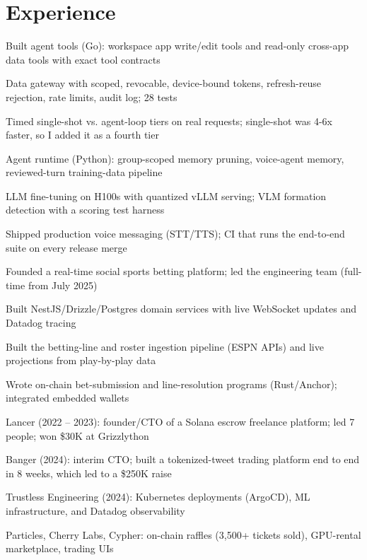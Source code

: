 \documentclass[print]{jack-resume}
\begin{document}
\section{Experience}

\begin{tightemize}
    \item Built agent tools (Go): workspace app write/edit tools and read-only cross-app data tools with exact tool contracts
    \item Data gateway with scoped, revocable, device-bound tokens, refresh-reuse rejection, rate limits, audit log; 28 tests
    \item Timed single-shot vs. agent-loop tiers on real requests; single-shot was 4-6x faster, so I added it as a fourth tier
    \item Agent runtime (Python): group-scoped memory pruning, voice-agent memory, reviewed-turn training-data pipeline
    \item LLM fine-tuning on H100s with quantized vLLM serving; VLM formation detection with a scoring test harness
    \item Shipped production voice messaging (STT/TTS); CI that runs the end-to-end suite on every release merge
\end{tightemize}
\sectionsep

\begin{tightemize}
    \item Founded a real-time social sports betting platform; led the engineering team (full-time from July 2025)
    \item Built NestJS/Drizzle/Postgres domain services with live WebSocket updates and Datadog tracing
    \item Built the betting-line and roster ingestion pipeline (ESPN APIs) and live projections from play-by-play data
    \item Wrote on-chain bet-submission and line-resolution programs (Rust/Anchor); integrated embedded wallets
\end{tightemize}
\sectionsep

\begin{tightemize}
    \item Lancer (2022 – 2023): founder/CTO of a Solana escrow freelance platform; led 7 people; won \$30K at Grizzlython
    \item Banger (2024): interim CTO; built a tokenized-tweet trading platform end to end in 8 weeks, which led to a \$250K raise
    \item Trustless Engineering (2024): Kubernetes deployments (ArgoCD), ML infrastructure, and Datadog observability
    \item Particles, Cherry Labs, Cypher: on-chain raffles (3,500+ tickets sold), GPU-rental marketplace, trading UIs
\end{tightemize}
\sectionsep
\end{document}
